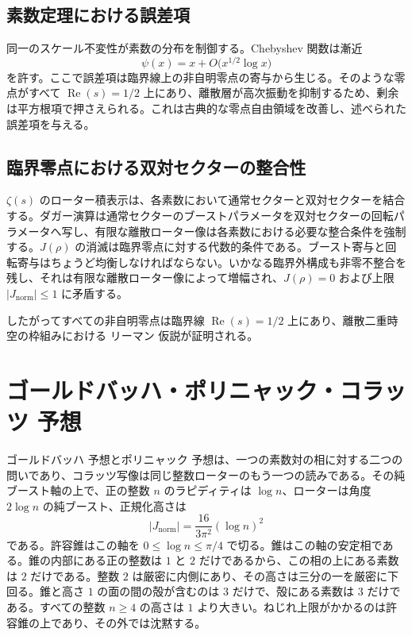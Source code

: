 \documentclass[a4paper]{article}
\theoremstyle{definition}
\theoremstyle{remark}
\newcommand{\Jnorm}{J_{\mathrm{norm}}}
\begin{document}
\subsection{素数定理における誤差項}

同一のスケール不変性が素数の分布を制御する。Chebyshev 関数は漸近
\[
\psi(x) = x + O\bigl(x^{1/2} \log x\bigr)
\]
を許す。ここで誤差項は臨界線上の非自明零点の寄与から生じる。そのような零点がすべて \(\operatorname{Re}(s) = 1/2\) 上にあり、離散層が高次振動を抑制するため、剰余は平方根項で押さえられる。これは古典的な零点自由領域を改善し、述べられた誤差項を与える。

\subsection{臨界零点における双対セクターの整合性}

\(\zeta(s)\) のローター積表示は、各素数において通常セクターと双対セクターを結合する。ダガー演算は通常セクターのブーストパラメータを双対セクターの回転パラメータへ写し、有限な離散ローター像は各素数における必要な整合条件を強制する。\(J(\rho)\) の消滅は臨界零点に対する代数的条件である。ブースト寄与と回転寄与はちょうど均衡しなければならない。いかなる臨界外構成も非零不整合を残し、それは有限な離散ローター像によって増幅され、\(J(\rho) = 0\) および上限 \(|\Jnorm| \leq 1\) に矛盾する。

したがってすべての非自明零点は臨界線 \(\operatorname{Re}(s) = 1/2\) 上にあり、離散二重時空の枠組みにおける リーマン 仮説が証明される。

\section{ゴールドバッハ・ポリニャック・コラッツ 予想}

ゴールドバッハ 予想とポリニャック 予想は、一つの素数対の相に対する二つの問いであり、コラッツ写像は同じ整数ローターのもう一つの読みである。その純ブースト軸の上で、正の整数 \(n\) のラピディティは \(\log n\)、ローターは角度 \(2\log n\) の純ブースト、正規化高さは
\[
|\Jnorm|=\frac{16}{3\pi^2}(\log n)^2
\]
である。許容錐はこの軸を \(0\le\log n\le\pi/4\) で切る。錐はこの軸の安定相である。錐の内部にある正の整数は \(1\) と \(2\) だけであるから、この相の上にある素数は \(2\) だけである。整数 \(2\) は厳密に内側にあり、その高さは三分の一を厳密に下回る。錐と高さ \(1\) の面の間の殻が含むのは \(3\) だけで、殻にある素数は \(3\) だけである。すべての整数 \(n\ge 4\) の高さは \(1\) より大きい。ねじれ上限がかかるのは許容錐の上であり、その外では沈黙する。
\end{document}
